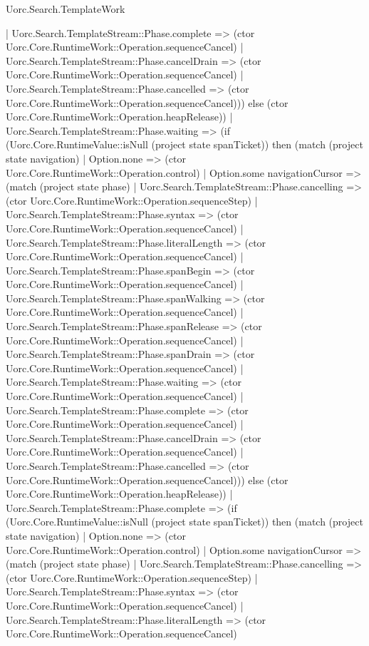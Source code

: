 \begin{lexlean}{Uorc.Search.TemplateWork}
\begin{semanticmodule}
{        | Uorc.Search.TemplateStream::Phase.complete => (ctor Uorc.Core.RuntimeWork::Operation.sequenceCancel)
        | Uorc.Search.TemplateStream::Phase.cancelDrain => (ctor Uorc.Core.RuntimeWork::Operation.sequenceCancel)
        | Uorc.Search.TemplateStream::Phase.cancelled => (ctor Uorc.Core.RuntimeWork::Operation.sequenceCancel))) else (ctor Uorc.Core.RuntimeWork::Operation.heapRelease))
    | Uorc.Search.TemplateStream::Phase.waiting => (if (Uorc.Core.RuntimeValue::isNull (project state spanTicket)) then (match (project state navigation)
      | Option.none => (ctor Uorc.Core.RuntimeWork::Operation.control)
      | Option.some navigationCursor => (match (project state phase)
        | Uorc.Search.TemplateStream::Phase.cancelling => (ctor Uorc.Core.RuntimeWork::Operation.sequenceStep)
        | Uorc.Search.TemplateStream::Phase.syntax => (ctor Uorc.Core.RuntimeWork::Operation.sequenceCancel)
        | Uorc.Search.TemplateStream::Phase.literalLength => (ctor Uorc.Core.RuntimeWork::Operation.sequenceCancel)
        | Uorc.Search.TemplateStream::Phase.spanBegin => (ctor Uorc.Core.RuntimeWork::Operation.sequenceCancel)
        | Uorc.Search.TemplateStream::Phase.spanWalking => (ctor Uorc.Core.RuntimeWork::Operation.sequenceCancel)
        | Uorc.Search.TemplateStream::Phase.spanRelease => (ctor Uorc.Core.RuntimeWork::Operation.sequenceCancel)
        | Uorc.Search.TemplateStream::Phase.spanDrain => (ctor Uorc.Core.RuntimeWork::Operation.sequenceCancel)
        | Uorc.Search.TemplateStream::Phase.waiting => (ctor Uorc.Core.RuntimeWork::Operation.sequenceCancel)
        | Uorc.Search.TemplateStream::Phase.complete => (ctor Uorc.Core.RuntimeWork::Operation.sequenceCancel)
        | Uorc.Search.TemplateStream::Phase.cancelDrain => (ctor Uorc.Core.RuntimeWork::Operation.sequenceCancel)
        | Uorc.Search.TemplateStream::Phase.cancelled => (ctor Uorc.Core.RuntimeWork::Operation.sequenceCancel))) else (ctor Uorc.Core.RuntimeWork::Operation.heapRelease))
    | Uorc.Search.TemplateStream::Phase.complete => (if (Uorc.Core.RuntimeValue::isNull (project state spanTicket)) then (match (project state navigation)
      | Option.none => (ctor Uorc.Core.RuntimeWork::Operation.control)
      | Option.some navigationCursor => (match (project state phase)
        | Uorc.Search.TemplateStream::Phase.cancelling => (ctor Uorc.Core.RuntimeWork::Operation.sequenceStep)
        | Uorc.Search.TemplateStream::Phase.syntax => (ctor Uorc.Core.RuntimeWork::Operation.sequenceCancel)
        | Uorc.Search.TemplateStream::Phase.literalLength => (ctor Uorc.Core.RuntimeWork::Operation.sequenceCancel)
}
\end{semanticmodule}
\end{lexlean}
